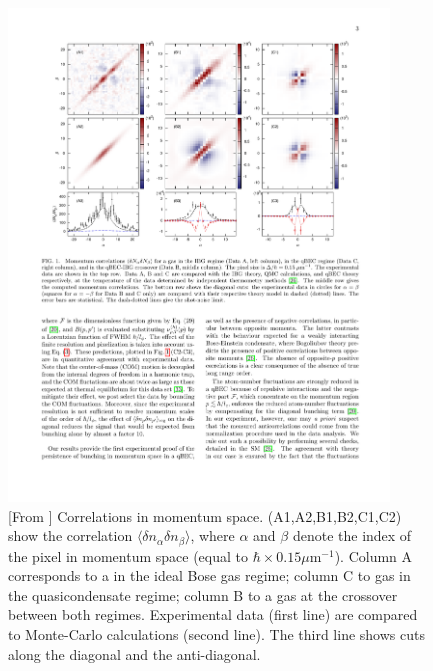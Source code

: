 \documentclass[onecolumn,amsfonts,showpacs,superscriptaddress]{revtex4-1}
\begin{document}
\begin{figure}
    \centering
    \includegraphics[width=0.9\textwidth,viewport=49 404 550 750,clip]{figures/correlk.pdf}
    \caption{[From \citep{fang_momentum-space_2016}] Correlations in momentum space.
    (A1,A2,B1,B2,C1,C2) show the correlation  $\langle \delta n_\alpha \delta n_\beta\rangle$, where $\alpha$ and $\beta$ denote the index of the pixel in momentum space (equal to $\hbar \times 0.15\mu$m$^{-1}$). Column A corresponds to a  in the ideal Bose gas regime; column C to gas in the quasicondensate regime; column B to a gas at the crossover between both regimes. Experimental data (first line) are compared to Monte-Carlo calculations (second line). The third line shows cuts along the diagonal and the anti-diagonal.}
    \label{fig:npnpp}
\end{figure}
\end{document}
